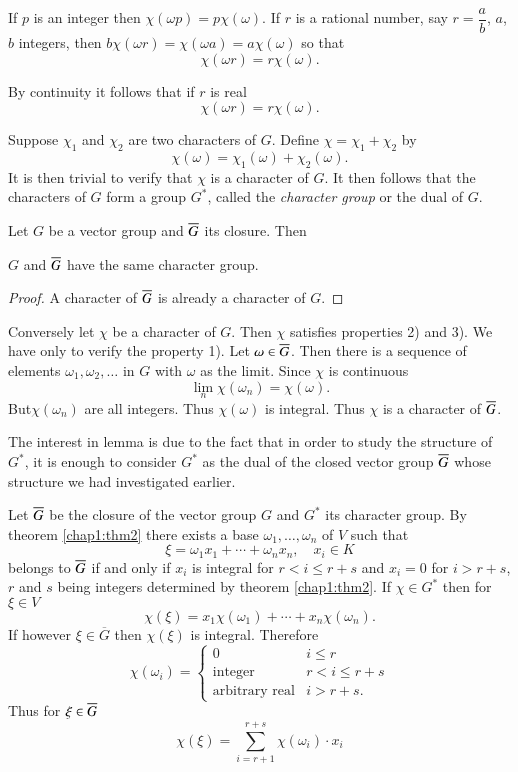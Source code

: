 If $p$ is an integer then $\chi(\omega p)=p\chi(\omega)$. If $r$ is a
rational number, say $r=\dfrac{a}{b}$, $a$, $b$ integers, then
$b\chi(\omega r)=\chi(\omega a)=a\chi(\omega)$ so that
$$
\chi(\omega r)=r\chi(\omega).
$$

By continuity it follows that if $r$ is real
$$
\chi(\omega r)=r\chi(\omega).
$$

Suppose $\chi_{1}$ and $\chi_{2}$ are two characters of $G$. Define
$\chi=\chi_{1}+\chi_{2}$ by
$$
\chi(\omega)=\chi_{1}(\omega)+\chi_{2}(\omega).
$$
It is then trivial to verify that $\chi$ is a character of $G$. It
then follows that the characters of $G$ form a group $G^{\ast}$,
called the {\em character group} or the dual of $G$.

Let $G$ be a vector group and $\overline{G}$ its closure. Then 

\begin{lemma*}
$G$ and $\overline{G}$ have the same character group.
\end{lemma*}

\begin{proof}
A character of $\overline{G}$ is already a character of $G$.
\end{proof}

Conversely let $\chi$ be a character of $G$. Then $\chi$ satisfies
properties 2) and 3). We have only to verify the property 1). Let
$\omega\in\overline{G}$. Then there is a sequence of elements
$\omega_{1},\omega_{2},\ldots$ in $G$ with $\omega$ as the
limit. Since $\chi$ is continuous
$$
\lim\limits_{n}\chi(\omega_{n})=\chi(\omega).
$$
But\pageoriginale $\chi(\omega_{n})$ are all integers. Thus
$\chi(\omega)$ is integral. Thus $\chi$ is a character of $\overline{G}$.

The interest in lemma is due to the fact that in order to study the
structure of $G^{\ast}$, it is enough to consider $G^{\ast}$ as the
dual of the closed vector group $\overline{G}$ whose structure we had
investigated earlier.

Let $\overline{G}$ be the closure of the vector group $G$ and $G^{\ast}$ its
character group. By theorem \ref{chap1:thm2} there exists a base
$\omega_{1},\ldots,\omega_{n}$ of $V$ such that
$$
\xi=\omega_{1}x_{1}+\cdots+\omega_{n}x_{n},\quad x_{i}\in K
$$
belongs to $\overline{G}$ if and only if $x_{i}$ is integral for $r<i\leq
r+s$ and $x_{i}=0$ for $i>r+s$, $r$ and $s$ being integers determined
by theorem \ref{chap1:thm2}. If $\chi\in G^{\ast}$ then for $\xi\in V$
$$
\chi(\xi)=x_{1}\chi(\omega_{1})+\cdots+x_{n}\chi(\omega_{n}).
$$
If however $\xi\in \overline{G}$ then $\chi(\xi)$ is
integral. Therefore
$$
\chi (\omega_i) =
\begin{cases}
0 & i\leq r\\
\text{integer} & r<i\leq r+s\\
\text{arbitrary real} & i>r+s.
\end{cases}
$$
Thus for $\xi\in\overline{G}$
$$
\chi(\xi)=\sum^{r+s}_{i=r+1}\chi(\omega_{i})\cdot x_{i}
$$

